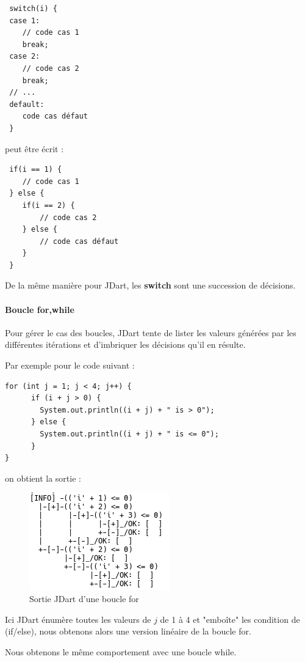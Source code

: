 \begin{verbatim}
 switch(i) {
 case 1:
	// code cas 1
	break;
 case 2:
	// code cas 2
	break;
 // ...
 default:
	code cas défaut
 }
\end{verbatim}

peut être écrit :
\begin{verbatim}
 if(i == 1) {
	// code cas 1
 } else {
	if(i == 2) {
		// code cas 2
	} else {
		// code cas défaut
	}
 }
\end{verbatim}

De la même manière pour JDart, les \textbf{switch} sont une succession de 
décisions.

\paragraph{Boucle for,while}
Pour gérer le cas des boucles, JDart tente de lister les valeurs générées par 
les différentes itérations et d'imbriquer les décisions  qu'il en résulte.


Par exemple pour le code suivant :

\begin{verbatim}
for (int j = 1; j < 4; j++) {
      if (i + j > 0) {
      	System.out.println((i + j) + " is > 0");
      } else {
      	System.out.println((i + j) + " is <= 0");
      }
}
\end{verbatim}
on obtient la sortie :
\begin{figure}[H]
 \centering
 \includegraphics[]{./images/jdart_loops.png}
 \caption{Sortie JDart d'une boucle for}
\end{figure}

Ici JDart énumère toutes les valeurs de $j$ de 1 à 4 et "embo\^ite" les 
condition de (if/else), nous obtenons alors une version linéaire de la boucle 
for.

Nous obtenons le même comportement avec une boucle while.

